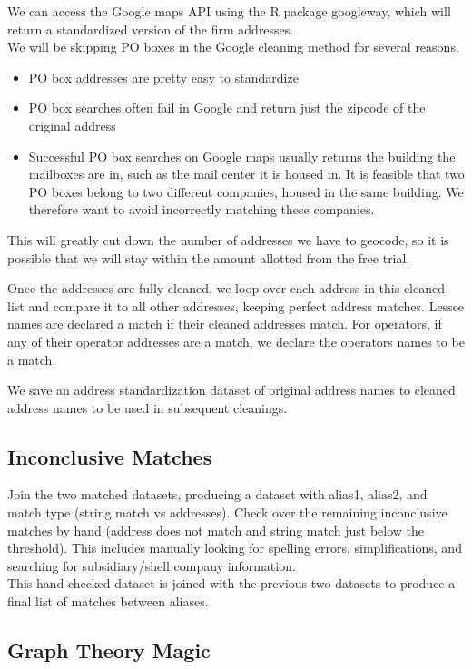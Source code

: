 \documentclass{article}
\begin{document}
We can access the Google maps API using the R package googleway, which will return a standardized version of the firm addresses. \\


We will be skipping PO boxes in the Google cleaning method for several reasons.
\begin{itemize}
    \item PO box addresses are pretty easy to standardize
    \item PO box searches often fail in Google and return just the zipcode of the original address
    \item Successful PO box searches on Google maps usually returns the building the mailboxes are in, such as the mail center it is housed in. It is feasible that two PO boxes belong to two different companies, housed in the same building. We therefore want to avoid incorrectly matching these companies. 
\end{itemize}
This will greatly cut down the number of addresses we have to geocode, so it is possible that we will stay within the amount allotted from the free trial. 

Once the addresses are fully cleaned, we loop over each address in this cleaned list and compare it to all other addresses, keeping perfect address matches. Lessee names are declared a match if their cleaned addresses match. For operators, if any of their operator addresses are a match, we declare the operators names to be a match.  

We save an address standardization dataset of original address names to cleaned address names to be used in subsequent cleanings. 

\subsection{Inconclusive Matches}

Join the two matched datasets, producing a dataset with alias1, alias2, and match type (string match vs addresses). Check over the  remaining inconclusive matches by hand (address does not match and string match just below the threshold). This includes manually looking for spelling errors, simplifications, and searching for subsidiary/shell company information.\\

This hand checked dataset is joined with the previous two datasets to produce a final list of matches between aliases. 

\subsection{Graph Theory Magic}
\end{document}
